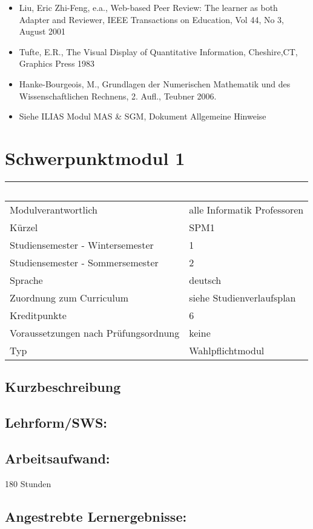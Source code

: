 \begin{itemize}
\item
  Liu, Eric Zhi-Feng, e.a., Web-based Peer Review: The learner as both
  Adapter and Reviewer, IEEE Transactions on Education, Vol 44, No 3,
  August 2001
\item
  Tufte, E.R., The Visual Display of Quantitative Information,
  Cheshire,CT, Graphics Press 1983
\item
  Hanke-Bourgeois, M., Grundlagen der Numerischen Mathematik und des
  Wissenschaftlichen Rechnens, 2. Aufl., Teubner 2006.
\item
  Siehe ILIAS Modul MAS \& SGM, Dokument Allgemeine Hinweise
\end{itemize}

\chapter{Schwerpunktmodul 1}\label{schwerpunktmodul-1}

\begin{longtable}[]{@{}ll@{}}
\toprule
~ & ~\tabularnewline
\midrule
\endhead
Modulverantwortlich & alle Informatik Professoren\tabularnewline
Kürzel & SPM1\tabularnewline
Studiensemester - Wintersemester & 1\tabularnewline
Studiensemester - Sommersemester & 2\tabularnewline
Sprache & deutsch\tabularnewline
Zuordnung zum Curriculum & siehe Studienverlaufsplan\tabularnewline
Kreditpunkte & 6\tabularnewline
Voraussetzungen nach Prüfungsordnung & keine\tabularnewline
Typ & Wahlpflichtmodul\tabularnewline
\bottomrule
\end{longtable}

\section*{Kurzbeschreibung}\label{kurzbeschreibung-2}

\section*{Lehrform/SWS:}\label{lehrformsws-3}

\section*{Arbeitsaufwand:}\label{arbeitsaufwand-3}

180 Stunden

\section*{Angestrebte
Lernergebnisse:}\label{angestrebte-lernergebnisse-3}

